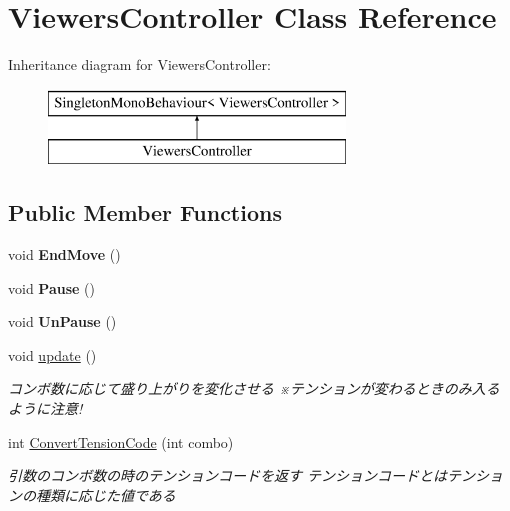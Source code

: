 \hypertarget{class_viewers_controller}{}\section{Viewers\+Controller Class Reference}
\label{class_viewers_controller}
Inheritance diagram for Viewers\+Controller\+:\begin{figure}[H]
\begin{center}
\leavevmode
\includegraphics[height=2.000000cm]{class_viewers_controller}
\end{center}
\end{figure}
\subsection*{Public Member Functions}
\begin{DoxyCompactItemize}
\item 
void {\bfseries End\+Move} ()\hypertarget{class_viewers_controller_a958c6ef12757f0efd9f1afb44b7ab696}{}\label{class_viewers_controller_a958c6ef12757f0efd9f1afb44b7ab696}

\item 
void {\bfseries Pause} ()\hypertarget{class_viewers_controller_a36ae39a64f0006f7e58cbce843ddc7e6}{}\label{class_viewers_controller_a36ae39a64f0006f7e58cbce843ddc7e6}

\item 
void {\bfseries Un\+Pause} ()\hypertarget{class_viewers_controller_aaf983938c60c79c987f19ee40cab94b2}{}\label{class_viewers_controller_aaf983938c60c79c987f19ee40cab94b2}

\item 
void \hyperlink{class_viewers_controller_a9fb0ed2747358b5ece64b300589e3bdd}{update} ()
\begin{DoxyCompactList}\small\item\em コンボ数に応じて盛り上がりを変化させる ※テンションが変わるときのみ入るように注意! \end{DoxyCompactList}\item 
int \hyperlink{class_viewers_controller_a137bc9b08416e19972912dd5be3329f8}{Convert\+Tension\+Code} (int combo)
\begin{DoxyCompactList}\small\item\em 引数のコンボ数の時のテンションコードを返す テンションコードとはテンションの種類に応じた値である \end{DoxyCompactList}\end{DoxyCompactItemize}

